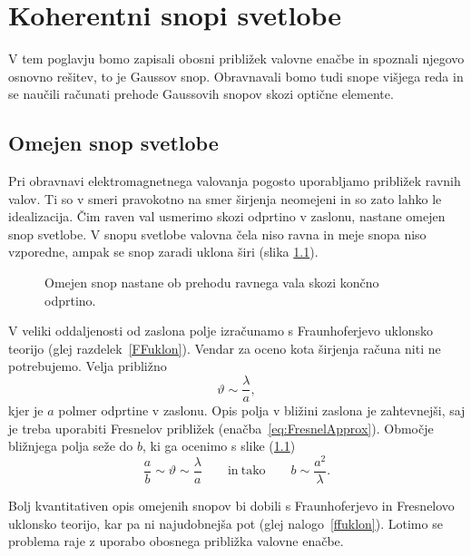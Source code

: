 
\chapter{Koherentni snopi svetlobe}
V tem poglavju bomo zapisali obosni približek valovne enačbe in spoznali 
njegovo osnovno rešitev, to je Gaussov snop. Obravnavali bomo tudi snope višjega reda in
se naučili računati prehode Gaussovih snopov skozi optične elemente. 

\section{Omejen snop svetlobe}
Pri obravnavi elektromagnetnega valovanja pogosto uporabljamo
približek ravnih valov. Ti so v smeri pravokotno na smer širjenja
neomejeni in so zato lahko le idealizacija. Čim raven val usmerimo skozi odprtino
v zaslonu, nastane omejen snop svetlobe. V snopu svetlobe valovna čela niso
ravna in meje snopa niso vzporedne, ampak se snop zaradi uklona širi 
(slika \ref{fig:Uklon-na-rezi}).
\begin{figure}[h]
\centering
\def\svgwidth{120truemm} 

\caption{Omejen snop nastane ob prehodu ravnega vala skozi končno odprtino.}
\label{fig:Uklon-na-rezi}
\end{figure}

V veliki oddaljenosti od zaslona polje izračunamo s
Fraunhoferjevo uklonsko teorijo (glej razdelek~\ref{FFuklon}). 
Vendar za oceno kota širjenja računa niti ne potrebujemo. Velja približno 
\begin{equation}
\vartheta\sim\frac{\lambda}{a},
\label{eq:kot_ocena}
\end{equation}
kjer je $a$ polmer odprtine v zaslonu.
Opis polja v bližini zaslona je zahtevnejši, saj je treba uporabiti 
Fresnelov približek (enačba~\ref{eq:FresnelApprox}).
Območje bližnjega polja seže do $b$, ki ga ocenimo s slike (\ref{fig:Uklon-na-rezi})
\begin{equation}
\frac{a}{b}\sim{\vartheta}\sim \frac{\lambda}{a} \qquad \mathrm{in~tako} \qquad b\sim\frac{a^2}{\lambda}.
\label{eq:z_ocena}
\end{equation}

Bolj kvantitativen opis omejenih
snopov bi dobili s Fraunhoferjevo in Fresnelovo uklonsko teorijo,
kar pa ni najudobnejša pot (glej nalogo~\ref{ffuklon}). Lotimo se problema raje z 
uporabo obosnega približka valovne enačbe.

